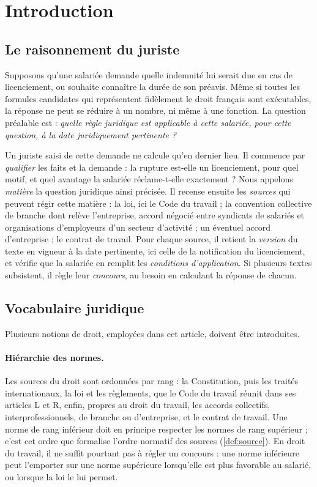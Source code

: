 
\section{Introduction}\label{sec:introduction}

\subsection{Le raisonnement du juriste} \label{sec:juriste}
Supposons qu'une salariée demande quelle indemnité lui serait due en cas de
licenciement, ou souhaite connaître la durée de son préavis. Même si toutes les
formules candidates qui représentent fidèlement le droit français sont
exécutables, la réponse ne peut se réduire à un nombre, ni même à une fonction.
La question préalable est : \emph{quelle règle juridique est applicable à cette
salariée, pour cette question, à la date juridiquement pertinente ?}

Un juriste saisi de cette demande ne calcule qu'en dernier lieu. Il commence par
\emph{qualifier} les faits et la demande : la rupture est-elle un licenciement,
pour quel motif, et quel avantage la salariée réclame-t-elle exactement ? Nous
appelons \emph{matière} la question juridique ainsi précisée. Il recense
ensuite les \emph{sources} qui peuvent régir cette matière : la loi, ici le
Code du travail ; la convention collective de branche dont relève l'entreprise,
accord négocié entre syndicats de salariés et organisations d'employeurs d'un
secteur d'activité ; un éventuel accord d'entreprise ; le contrat de travail.
Pour chaque source, il retient la \emph{version} du texte en vigueur à la date
pertinente, ici celle de la notification du licenciement, et vérifie que la
salariée en remplit les \emph{conditions d'application}. Si plusieurs textes
subsistent, il règle leur \emph{concours}, au besoin en calculant la
réponse de chacun. 

\subsection{Vocabulaire juridique}\label{sec:vocabulaire}
%
Plusieurs notions de droit, employées dans cet article, doivent être introduites.

\paragraph{Hiérarchie des normes.} Les sources du droit sont ordonnées par
  rang : la Constitution, puis les traités internationaux, la loi et les
  règlements, que le Code du travail réunit dans ses articles L et R, enfin,
  propres au droit du travail, les accords collectifs, interprofessionnels, de
  branche ou d'entreprise, et le contrat de travail. Une norme de rang
  inférieur doit en principe respecter les normes de rang supérieur ; c'est cet
  ordre que formalise l'ordre normatif des sources
  (\autoref{def:source}). En droit du travail, il ne suffit
  pourtant pas à régler un concours : une norme inférieure peut l'emporter sur
  une norme supérieure lorsqu'elle est plus favorable au salarié, ou lorsque la
  loi le lui permet.
